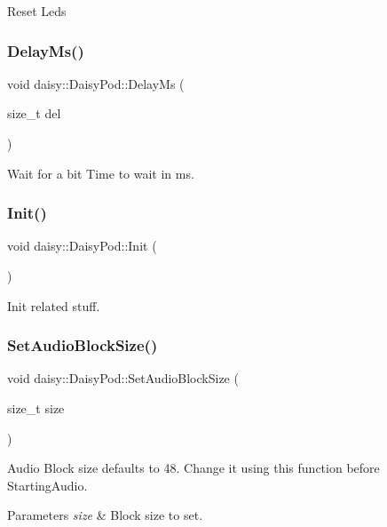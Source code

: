 Reset Leds \mbox{\label{classdaisy_1_1_daisy_pod_ac6a34858e9341fafa30d8cec8619a96f}} 
\subsubsection{\texorpdfstring{Delay\+Ms()}{DelayMs()}}
{\footnotesize\ttfamily void daisy\+::\+Daisy\+Pod\+::\+Delay\+Ms (\begin{DoxyParamCaption}\item[{size\+\_\+t}]{del }\end{DoxyParamCaption})}

Wait for a bit  Time to wait in ms. \mbox{\label{classdaisy_1_1_daisy_pod_a1a01a9e39345cdf1f207938fd988d26a}} 
\subsubsection{\texorpdfstring{Init()}{Init()}}
{\footnotesize\ttfamily void daisy\+::\+Daisy\+Pod\+::\+Init (\begin{DoxyParamCaption}{ }\end{DoxyParamCaption})}

Init related stuff. \mbox{\label{classdaisy_1_1_daisy_pod_ac05d6bd0d67760e875c2071652fa0ff3}} 
\subsubsection{\texorpdfstring{Set\+Audio\+Block\+Size()}{SetAudioBlockSize()}}
{\footnotesize\ttfamily void daisy\+::\+Daisy\+Pod\+::\+Set\+Audio\+Block\+Size (\begin{DoxyParamCaption}\item[{size\+\_\+t}]{size }\end{DoxyParamCaption})}

Audio Block size defaults to 48. Change it using this function before Starting\+Audio. 
\begin{DoxyParams}{Parameters}
{\em size} & Block size to set. \\
\hline
\end{DoxyParams}
\mbox{\label{classdaisy_1_1_daisy_pod_ac98cbdd0e34ec2cb994ca012f05e6317}} 
